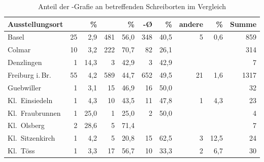 \begin{table}
\centering
\caption{Anteil der -Grafie an betreffenden Schreiborten im Vergleich}
\begin{tabular}{
	l @{\qquad}
	r r @{\qquad}
	r r @{\qquad}
	r r @{\qquad}
	r r @{\qquad}
	r}

\toprule

\bfseries Ausstellungsort
	& \bfseries \norm{-i} & \bfseries \%
	& \bfseries \norm{-e} & \bfseries \%
	& \bfseries -Ø & \bfseries \%
	& \bfseries andere & \bfseries \%
	& \bfseries Summe
	\\

\midrule

Basel
	& 25	& 2,9
	& 481	& 56,0
	& 348	& 40,5
	& 5		& 0,6
	& 859
	\\

\midrule

Colmar
	& 10	& 3,2
	& 222	& 70,7
	& 82	& 26,1
	& 		&
	& 314
	\\

\midrule

Denzlingen
	& 1 & 14,3
	& 3	& 42,9
	& 3	& 42,9
	& 	&
	& 7
	\\

\midrule

Freiburg i.\,Br.
	& 55	& 4,2
	& 589	& 44,7
	& 652	& 49,5
	& 21	& 1,6
	& 1317
	\\

\midrule

Guebwiller
	& 1		& 3,1
	& 15	& 46,9
	& 16	& 50,0
	& 		&
	& 32
	\\

\midrule

Kl.~Einsiedeln
	& 1		& 4,3
	& 10	& 43,5
	& 11	& 47,8
	& 1		& 4,3
	& 23
	\\

\midrule

Kl.~Fraubrunnen
	& 1	& 25,0
	& 1	& 25,0
	& 2	& 50,0
	&	&
	& 4
	\\

\midrule

Kl.~Olsberg
	& 2	& 28,6
	& 5	& 71,4
	&	&
	&	&
	& 7
	\\

\midrule

Kl.~Sitzenkirch
	& 1		& 4,2
	& 5		& 20,8
	& 15	& 62,5
	& 3		& 12,5
	& 24
	\\

\midrule

Kl.~Töss
	& 1		& 3,3
	& 17	& 56,7
	& 10	& 33,3
	& 2		& 6,7
	& 30
	\\


\end{tabular}
\end{table}
